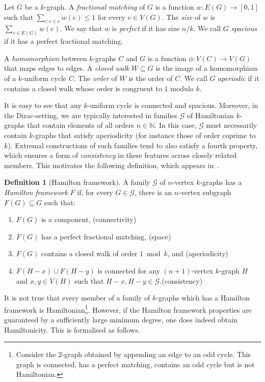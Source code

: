 \documentclass[12pt,reqno]{amsart}
\theoremstyle{plain}
\theoremstyle{definition}
\newtheorem{definition}[theorem]{Definition}
\numberwithin{equation}{section}
\renewcommand{\subset}{\subseteq}
\newcommand{\NATS}{\mathbb{N}}
\newcommand{\cG}{\mathcal{G}}
\begin{document}
	Let $G$ be a $k$-graph.
	A \emph{fractional matching} of $G$ is a function $w\colon E(G) \to [0,1]$ such that $\sum_{e\colon v \in e} w (e) \leq 1$ for every $v \in V(G)$.
	The \emph{size} of $w$ is $\sum_{e \in E(G)} w (e)$.
	We say that $w$ is \emph{perfect} if it has size $n/k$. We call $G$ \emph{spacious} if it has a perfect fractional matching.
	
	A \emph{homomorphism} between $k$-graphs $C$ and $G$ is a function $\phi \colon V(C) \to V(G)$ that maps edges to edges. A \emph{closed walk} $W \subseteq G$ is the image of a homomorphism of a $k$-uniform cycle $C$. The \emph{order} of $W$ is the order of $C$. 
	We call $G$ \emph{aperiodic} if it contains a closed walk whose order is congruent to $1$ modulo $k$.
	
	It is easy to see that any $k$-uniform cycle is connected and spacious.
	Moreover, in the Dirac-setting, we are typically interested in families $\cG$ of Hamiltonian $k$-graphs that contain elements of all orders $n \in \NATS$.
	In this case, $\cG$ must necessarily contain $k$-graphs that satisfy aperiodicity (for instance those of order coprime to $k$). 
	Extremal constructions of such families tend to also satisfy a fourth property, which ensures a form of \emph{consistency} in these features across closely related members. This motivates the following definition, which appears in~\cite{LS24a}.
	
	\begin{definition}[Hamilton framework]\label{def:hamilton-framework}
		A family $\cG$ of $n$-vertex $k$-graphs has a \emph{Hamilton framework} $F$ if, for every $G \in \cG$, there is an {$n$-vertex} subgraph $F(G) \subset G$ such that:
		\begin{enumerate}[(F1)]
			\item \label{itm:hf-connected} $F(G)$ is a component, \hfill(connectivity)
			\item \label{itm:hf-matching} $F(G)$ has a perfect fractional matching, \hfill(space)
			\item \label{itm:hf-odd} $F(G)$ contains a closed walk of order $1 \bmod k$, and \hfill(aperiodicity)
			\item \label{itm:hf-intersecting} {$F(H-x) \cup F(H-y)$ is connected for any $(n+1)$-vertex $k$-graph $H$ and $x,y \in V(H)$ such that $H-x, H-y \in \cG$.\hfill(consistency)}
		\end{enumerate}
	\end{definition}
	
	It is not true that every member of a family of $k$-graphs which has a Hamilton framework is Hamiltonian\footnote{
		Consider the $2$-graph obtained by appending an edge to an odd cycle. This graph is connected, has a perfect matching, contains an odd cycle but is not Hamiltonian.
	}.
	However, if the Hamilton framework properties are guaranteed by a sufficiently large minimum degree, one does indeed obtain Hamiltonicity.
	This is formalised as follows.
	
\end{document}
